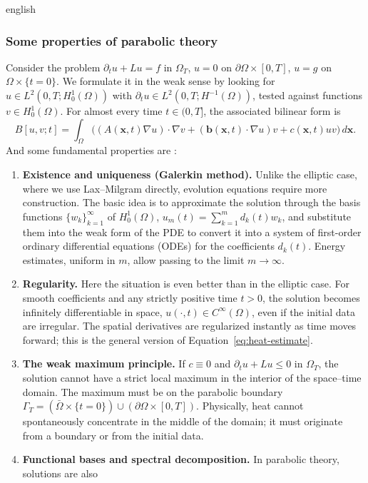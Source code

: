 \documentclass[0000.tex]{subfiles}
\begin{document}
\begin{hyphenrules}{english}
\subsubsection{Some properties of parabolic theory}
Consider the problem $\partial_t u+Lu=f$ in $\Omega_T$, $u=0$ on $\partial\Omega\times[0,T]$,
$u=g$ on $\Omega\times\{t=0\}$. We formulate it in the weak sense by looking for
$u\in L^2(0,T;H^1_0(\Omega))$ with $\partial_t u\in L^2(0,T;H^{-1}(\Omega))$, tested against functions
$v\in H^1_0(\Omega)$. For almost every time $t\in(0,T]$, the associated bilinear form is
\begin{equation}
  B[u,v;t]=\int_\Omega\Big((A(\mathbf{x},t)\nabla u)\cdot\nabla v+(\mathbf{b}(\mathbf{x},t)\cdot\nabla u)v+c(\mathbf{x},t)uv\Big)\,d\mathbf{x}.
  \label{eq:parabolic-bilinear}
\end{equation}
And some fundamental properties are \cite{evans2010}:
\begin{enumerate}
  \item \textbf{Existence and uniqueness (Galerkin method).} Unlike the elliptic case, where we use
    Lax--Milgram directly, evolution equations require more construction. The basic idea is to
    approximate the solution through the basis functions $\{w_k\}_{k=1}^\infty$ of $H^1_0(\Omega)$,
    $u_m(t)=\sum_{k=1}^m d_k(t)w_k$, and substitute them into the weak form of the PDE to convert it
    into a system of first-order ordinary differential equations (ODEs) for the coefficients $d_k(t)$.
    Energy estimates, uniform in $m$, allow passing to the limit $m\to\infty$.
  \item \textbf{Regularity.} Here the situation is even better than in the elliptic case. For smooth
    coefficients and any strictly positive time $t>0$, the solution becomes infinitely differentiable
    in space, $u(\cdot,t)\in C^\infty(\Omega)$, even if the initial data are irregular. The spatial
    derivatives are regularized instantly as time moves forward; this is the general version of
    Equation~\eqref{eq:heat-estimate}.
  \item \textbf{The weak maximum principle.} If $c\equiv0$ and $\partial_t u+Lu\le0$ in $\Omega_T$, the
    solution cannot have a strict local maximum in the interior of the space--time domain. The maximum
    must be on the parabolic boundary $\Gamma_T=(\bar\Omega\times\{t=0\})\cup(\partial\Omega\times[0,T])$.
    Physically, heat cannot spontaneously concentrate in the middle of the domain; it must originate
    from a boundary or from the initial data.
  \item \textbf{Functional bases and spectral decomposition.} In parabolic theory, solutions are also

\end{enumerate}
\end{hyphenrules}
\end{document}

